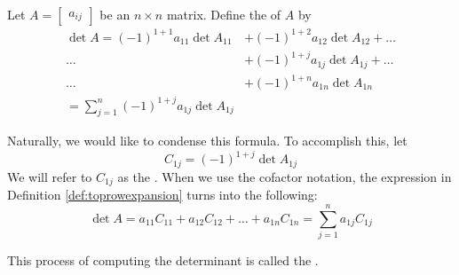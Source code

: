 \documentclass{ximera}
\begin{document}
\begin{definition}\label{def:toprowexpansion}  Let $A=\begin{bmatrix}a_{ij}\end{bmatrix}$ be an $n\times n$ matrix.  Define the  of $A$ by
\begin{align*}\det{A}=(-1)^{1+1}a_{11}\det{A_{11}}&+(-1)^{1+2}a_{12}\det{A_{12}}+\ldots \\
\ldots &+(-1)^{1+j}a_{1j}\det{A_{1j}}+\ldots \\
\ldots &+(-1)^{1+n}a_{1n}\det{A_{1n}}\\
=\sum_{j=1}^n(-1)^{1+j}a_{1j}\det{A_{1j}}
\end{align*}
\end{definition}
Naturally, we would like to condense this formula.  To accomplish this, let
$$C_{1j}=(-1)^{1+j}\det{A_{1j}}$$
We will refer to $C_{1j}$ as the .  When we use the cofactor notation, the expression in Definition \ref{def:toprowexpansion} turns into the following:
$$\det{A}=a_{11}C_{11}+a_{12}C_{12}+\ldots +a_{1n}C_{1n}=\sum_{j=1}^n a_{1j}C_{1j}$$

This process of computing the determinant is called the .  
\end{document}
